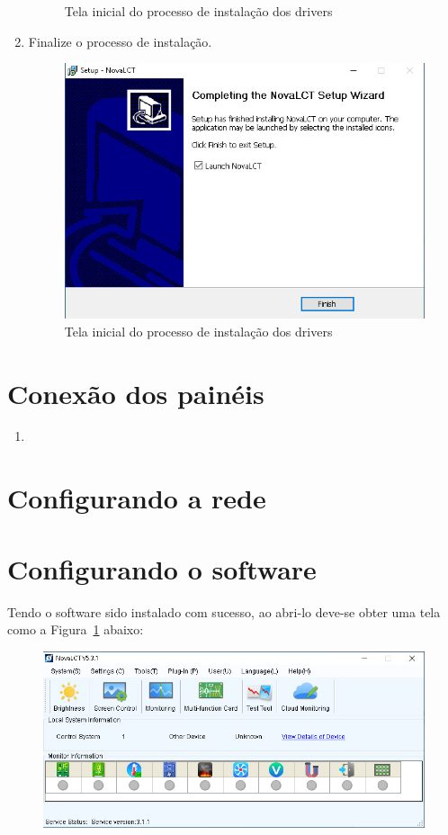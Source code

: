 \documentclass[12pt, a4paper]{article}
\begin{document}
\begin{enumerate}
\begin{figure}[!htb]
			\caption{Tela inicial do processo de instalação dos drivers}
		\end{figure}
		\newpage
		\item Finalize o processo de instalação.
		\begin{figure}[!htb]
			\centering
			\includegraphics[width=.8\textwidth]{DEnd.jpeg}
			\caption{Tela inicial do processo de instalação dos drivers}
		\end{figure}
	\end{enumerate}

	\section{Conexão dos painéis}\label{Conexão dos painéis}
		\begin{enumerate}
			\item 
		\end{enumerate}
	\section{Configurando a rede}\label{Configurando a rede}

	\section{Configurando o software}\label{Configurando o software}
	Tendo o software sido instalado com sucesso, ao abri-lo deve-se obter uma tela como a Figura~\ref{fig:CS1.jpeg} abaixo:
	\begin{figure}[!htb]
		\centering
		\includegraphics[width=\textwidth]{CS1.jpeg}
		\caption{\label{fig:CS1.jpeg}}
	\end{figure}
\end{document}

